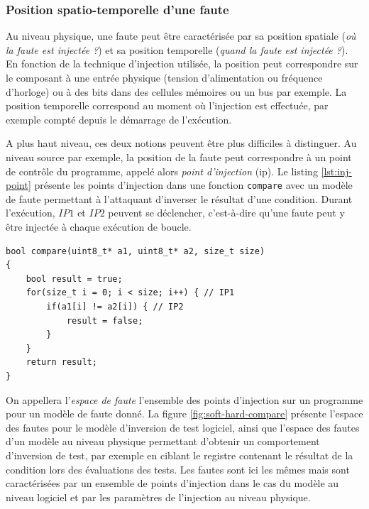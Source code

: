             \subsubsection{Position spatio-temporelle d'une faute}
            
                Au niveau physique, une faute peut être caractérisée par sa position spatiale (\textit{où la faute est injectée ?}) et sa position temporelle (\textit{quand la faute est injectée ?}). En fonction de la technique d'injection utilisée, la position peut correspondre sur le composant à une entrée physique (tension d'alimentation ou fréquence d'horloge) ou à des bits dans des cellules mémoires ou un bus par exemple.
                La position temporelle correspond au moment où l'injection est effectuée, par exemple compté depuis le démarrage de l'exécution.
                
                A plus haut niveau, ces deux notions peuvent être plus difficiles à distinguer. Au niveau source par exemple, la position de la faute peut correspondre à un point de contrôle du programme, appelé alors \textit{point d'injection} (\gls{ip}). Le listing \ref{lst:inj-point} présente les points d'injection dans une fonction \texttt{compare} avec un modèle de faute permettant à l'attaquant d'inverser le résultat d'une condition. Durant l'exécution, $IP1$ et $IP2$ peuvent se déclencher, c'est-à-dire qu'une faute peut y être injectée à chaque exécution de boucle. 
            
\begin{lstlisting}     
bool compare(uint8_t* a1, uint8_t* a2, size_t size)
{
    bool result = true;
    for(size_t i = 0; i < size; i++) { // IP1
        if(a1[i] != a2[i]) { // IP2
            result = false;
        }
    }
    return result;
}
\end{lstlisting}            

                On appellera l'\textit{espace de faute} l'ensemble des points d'injection sur un programme pour un modèle de faute donné. La figure \ref{fig:soft-hard-compare} présente l'espace des fautes pour le modèle d'inversion de test logiciel, ainsi que l'espace des fautes d'un modèle au niveau physique permettant d'obtenir un comportement d'inversion de test, par exemple en ciblant le registre contenant le résultat de la condition lors des évaluations des tests. Les fautes sont ici les mêmes mais sont caractérisées par un ensemble de points d'injection dans le cas du modèle au niveau logiciel et par les paramètres de l'injection au niveau physique.
                
